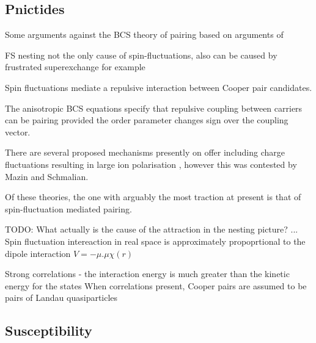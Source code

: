 \subsection{Pnictides}

Some arguments against the BCS theory of pairing \cite{Haule2008,Yndurain2009,Mazin2008} based on arguments of 

FS nesting not the only cause of spin-fluctuations, also can be caused by frustrated superexchange for example %

Spin fluctuations mediate a repulsive interaction between Cooper pair candidates.

The anisotropic BCS equations specify that repulsive coupling between carriers can be pairing provided the order parameter changes sign over the coupling vector.


There are several proposed mechanisms presently on offer including charge fluctuations resulting in large ion polarisation \cite{Berciu2009}, however this was contested by Mazin and Schmalian\cite{Mazin2009}.


Of these theories, the one with arguably the most traction at present is that of spin-fluctuation mediated pairing. 

TODO: What actually is the cause of the attraction in the nesting picture? ... Spin fluctuation intereaction in real space is approximately propoprtional to the dipole interaction $V=-\mu . \mu \chi(r)$\cite{Bergemann2003} 



Strong correlations - the interaction energy is much greater than the kinetic energy for the states
When correlations present, Cooper pairs are assumed to be pairs of Landau quasiparticles


\subsection{Susceptibility}
    \label{Sec:1:NestingSusceptibility}

